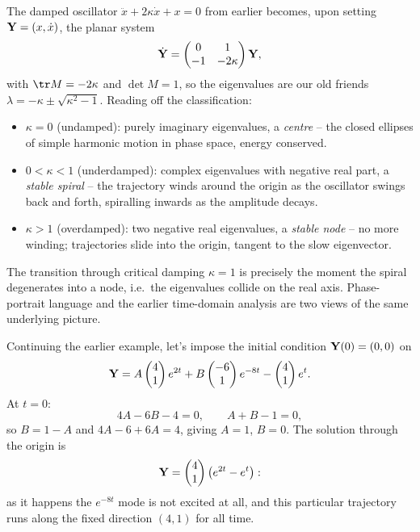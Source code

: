 \documentclass[a4paper]{scrartcl}
\begin{document}
\begin{example}
	The damped oscillator $\ddot x + 2\kappa \dot x + x = 0$ from earlier becomes, upon setting $\mathbf{Y} = (x, \dot x)$, the planar system
	$$
	\dot{\mathbf{Y}} = \begin{pmatrix} 0 & 1 \\ -1 & -2\kappa \end{pmatrix} \mathbf{Y},
	$$
	with $\tr M = -2\kappa$ and $\det M = 1$, so the eigenvalues are our old friends $\lambda = -\kappa \pm \sqrt{\kappa^2 - 1}$. Reading off the classification:
	\begin{itemize}
		\item $\kappa = 0$ (undamped): purely imaginary eigenvalues, a \emph{centre} -- the closed ellipses of simple harmonic motion in phase space, energy conserved.
		\item $0 < \kappa < 1$ (underdamped): complex eigenvalues with negative real part, a \emph{stable spiral} -- the trajectory winds around the origin as the oscillator swings back and forth, spiralling inwards as the amplitude decays.
		\item $\kappa > 1$ (overdamped): two negative real eigenvalues, a \emph{stable node} -- no more winding; trajectories slide into the origin, tangent to the slow eigenvector.
	\end{itemize}
	The transition through critical damping $\kappa = 1$ is precisely the moment the spiral degenerates into a node, i.e.\ the eigenvalues collide on the real axis. Phase-portrait language and the earlier time-domain analysis are two views of the same underlying picture.
\end{example}

\begin{example}
	Continuing the earlier example, let's impose the initial condition $\mathbf{Y}(0) = (0, 0)$ on
	$$
	\mathbf{Y} = A \begin{pmatrix} 4 \\ 1 \end{pmatrix} e^{2t} + B \begin{pmatrix} -6 \\ 1 \end{pmatrix} e^{-8t} - \begin{pmatrix} 4 \\ 1 \end{pmatrix} e^t.
	$$
	At $t = 0$:
	$$
	4A - 6B - 4 = 0, \qquad A + B - 1 = 0,
	$$
	so $B = 1 - A$ and $4A - 6 + 6A = 4$, giving $A = 1$, $B = 0$. The solution through the origin is
	$$
	\mathbf{Y} = \begin{pmatrix} 4 \\ 1\end{pmatrix}\left(e^{2t} - e^t\right):
	$$
	as it happens the $e^{-8t}$ mode is not excited at all, and this particular trajectory runs along the fixed direction $(4, 1)$ for all time.
\end{example}
\end{document}
